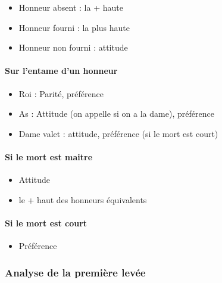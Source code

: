 \documentclass[a4paper]{article}
\begin{document}
\begin{itemize}
\item Honneur absent : la + haute

\item Honneur fourni : la plus haute

\item Honneur non fourni : attitude

\end{itemize}

\paragraph{Sur l’entame d’un honneur}

\begin{itemize}
\item Roi : Parité, préférence

\item As : Attitude (on appelle si on a la dame), préférence

\item Dame valet : attitude, préférence (si le mort est court)

\end{itemize}

\paragraph{Si le mort est maitre}

\begin{itemize}
\item Attitude

\item le + haut des honneurs équivalents

\end{itemize}

\paragraph{Si le mort est court}

\begin{itemize}
\item Préférence

\end{itemize}

\subsubsection{Analyse de la première levée}
\end{document}
